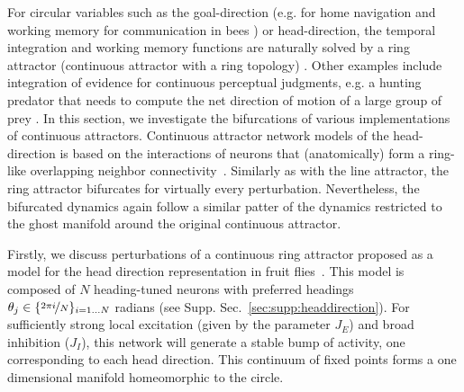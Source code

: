 \documentclass{article} %
\newcounter{ct}
\theoremstyle{definition}
\theoremstyle{remark}
\begin{document}
For circular variables such as the goal-direction (e.g. for home navigation and working memory for communication	 in bees \citep{frisch1993dance}) %
or head-direction, the temporal integration and working memory functions are naturally solved by a ring attractor (continuous attractor with a ring topology) \citep{kim2019generation, turner2017angular, turner2020neuroanatomical,hulse2020mechanisms,taube2007head}.
Other examples include
integration of evidence for continuous perceptual judgments, e.g. a hunting predator that needs to compute the net direction of motion of a large group of prey \citep{esnaola2022flexible}.
In this section, we investigate the bifurcations of various implementations of continuous attractors.
Continuous attractor network models of the head-direction is based on the interactions of neurons that (anatomically) form a ring-like overlapping neighbor connectivity~\citep{zhang1996,Noorman2022,ajabi2023,vafidis2022,boucheny2005continuous,knierim2012}.
Similarly as with the line attractor, the ring attractor bifurcates for virtually every perturbation.
Nevertheless, the bifurcated dynamics again follow a similar patter of the dynamics restricted to the ghost manifold around the original continuous attractor.

Firstly, we discuss perturbations of a continuous ring attractor proposed as a model for the head direction representation in fruit flies~\citep{Noorman2022}.
This model is composed of $N$ heading-tuned neurons with preferred headings $\theta_j \in \{\nicefrac{2\pi i}{N}\}_{i=1\dots N}$ radians (see Supp. Sec.~\ref{sec:supp:headdirection}).
For sufficiently strong local excitation (given by the parameter $J_E$) and broad inhibition ($J_I$), this network will generate a stable bump of activity, one corresponding to each head direction. 
This continuum of fixed points forms a one dimensional manifold homeomorphic to the circle.
\end{document}
